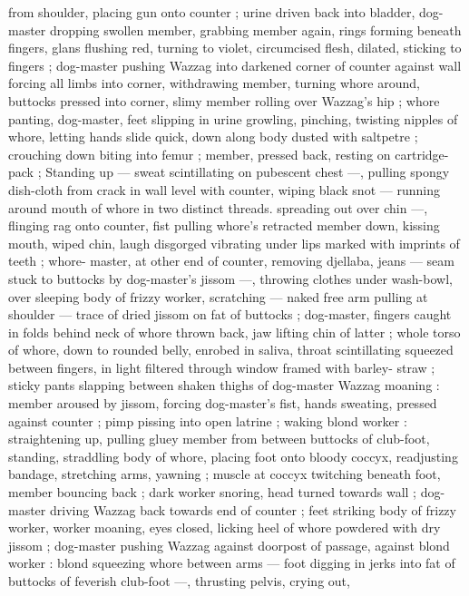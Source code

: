 from shoulder, placing gun onto counter ; urine driven back into 
bladder, dog-master dropping swollen member, grabbing member 
again, rings forming beneath fingers, glans flushing red, turning to 
violet, circumcised flesh, dilated, sticking to fingers ; dog-master 
pushing Wazzag into darkened corner of counter against wall 
forcing all limbs into corner, withdrawing member, turning whore 
around, buttocks pressed into corner, slimy member rolling over 
Wazzag's hip ; whore panting, dog-master, feet slipping in urine 
growling, pinching, twisting nipples of whore, letting hands slide 
quick, down along body dusted with saltpetre ; crouching down 
biting into femur ; member, pressed back, resting on cartridge-pack 
; Standing up --- sweat scintillating on pubescent chest ---, pulling 
spongy dish-cloth from crack in wall level with counter, wiping black 
snot --- running around mouth of whore in two distinct threads. 
spreading out over chin ---, flinging rag onto counter, fist pulling 
whore's retracted member down, kissing mouth, wiped chin, laugh 
disgorged vibrating under lips marked with imprints of teeth ; whore- 
master, at other end of counter, removing djellaba, jeans --- seam 
stuck to buttocks by dog-master's jissom ---, throwing clothes under 
wash-bowl, over sleeping body of frizzy worker, scratching --- naked 
free arm pulling at shoulder --- trace of dried jissom on fat of 
buttocks ; dog-master, fingers caught in folds behind neck of whore 
thrown back, jaw lifting chin of latter ; whole torso of whore, down to 
rounded belly, enrobed in saliva, throat scintillating squeezed 
between fingers, in light filtered through window framed with barley- 
straw ; sticky pants slapping between shaken thighs of dog-master 
Wazzag moaning : member aroused by jissom, forcing dog-master's 
fist, hands sweating, pressed against counter ; pimp pissing into 
open latrine ; waking blond worker : straightening up, pulling gluey 
member from between buttocks of club-foot, standing, straddling 
body of whore, placing foot onto bloody coccyx, readjusting 
bandage, stretching arms, yawning ; muscle at coccyx twitching 
beneath foot, member bouncing back ; dark worker snoring, head 
turned towards wall ; dog-master driving Wazzag back towards end 
of counter ; feet striking body of frizzy worker, worker moaning, eyes 
closed, licking heel of whore powdered with dry jissom ; dog-master 
pushing Wazzag against doorpost of passage, against blond worker 
: blond squeezing whore between arms --- foot digging in jerks into 
fat of buttocks of feverish club-foot ---, thrusting pelvis, crying out, 
